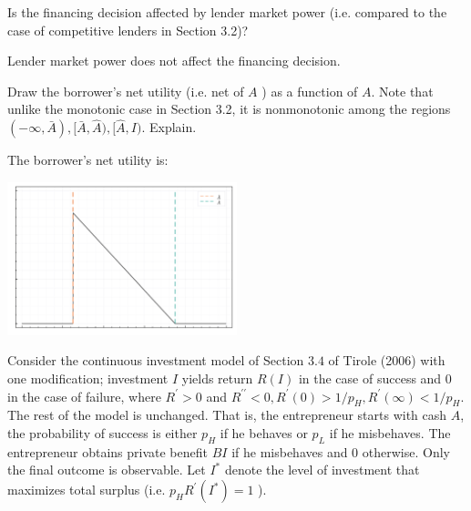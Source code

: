 \documentclass[12pt]{amsart}
\begin{document}
{{\begin{subexercise}
    Is the financing decision affected by lender market power (i.e. compared to the case of competitive lenders in Section 3.2)?

\end{subexercise}

\begin{answer}
    Lender market power does not affect the financing decision.
\end{answer}

\begin{subexercise}
    Draw the borrower's net utility (i.e. net of $A$ ) as a function of $A$. Note that unlike the monotonic case in Section 3.2,
    it is nonmonotonic among the regions $(-\infty, \bar{A}),[\bar{A}, \widehat{A}),[\widehat{A}, I)$. Explain.
\end{subexercise}

\begin{answer}
    The borrower's net utility is:
    \begin{center}
        \includegraphics[width=0.5\textwidth]{figures/exercise_2_1.pdf}
    \end{center}
\end{answer}

\begin{exercise}
    Consider the continuous investment model of Section $3.4$ of Tirole (2006) with one modification; investment $I$ yields return $R(I)$ 
    in the case of success and 0 in the case of failure, where $R^{\prime}>0$ and $R^{\prime \prime}<0, R^{\prime}(0)>1 / p_{H}, R^{\prime}(\infty)<1 / p_{H}$. 
    The rest of the model is unchanged. That is, the entrepreneur starts with cash $A$, the probability of success is either $p_{H}$ if he behaves or $p_{L}$ 
    if he misbehaves. The entrepreneur obtains private benefit $B I$ if he misbehaves and 0 otherwise. Only the final outcome is observable. Let $I^{*}$ 
    denote the level of investment that maximizes total surplus (i.e. $p_{H} R^{\prime}\left(I^{*}\right)=1$ ).
\end{exercise}

}}
\end{document}
